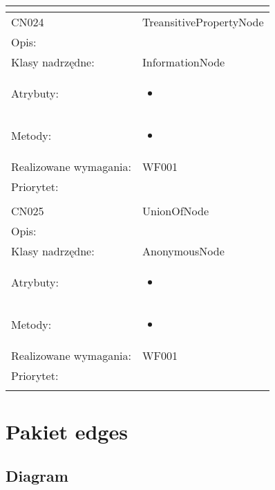 \documentclass[a4paper,10pt]{article}
\begin{document}
\begin{center}
\begin{longtable}{|m{3cm}|m{9cm}|}
\multicolumn{2}{c}{} \\
 \hline

CN024 & TreansitivePropertyNode \\ \hline
Opis: &     \\ \hline
Klasy nadrzędne: & InformationNode     \\ \hline
Atrybuty: & \begin{itemize}
 \item 
\end{itemize}
 \\ \hline
Metody: & \begin{itemize}
 \item 
\end{itemize}
  \\ \hline
Realizowane wymagania: & WF001 \\ \hline
Priorytet: &  \\ \hline

\multicolumn{2}{c}{} \\
 \hline

CN025 & UnionOfNode \\ \hline
Opis: &     \\ \hline
Klasy nadrzędne: & AnonymousNode     \\ \hline
Atrybuty: & \begin{itemize}
 \item 
\end{itemize}
 \\ \hline
Metody: & \begin{itemize}
 \item 
\end{itemize}
  \\ \hline
Realizowane wymagania: & WF001 \\ \hline
Priorytet: &  \\ \hline

\multicolumn{2}{c}{} \\
 \hline


\end{longtable}

\end{center}

\section{Pakiet edges}

\subsection{Diagram}
\end{document}
